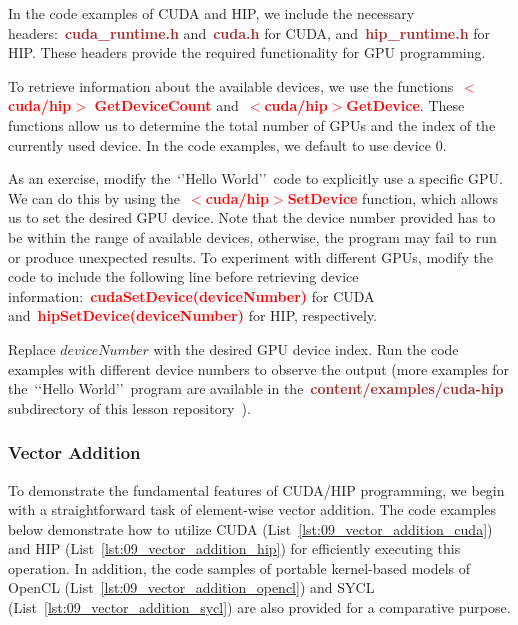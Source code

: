 


\par
In the code examples of CUDA and HIP, we include the necessary headers:~\textbf{\textcolor{brown}{cuda\_runtime.h}} and~\textbf{\textcolor{brown}{cuda.h}} for CUDA, and~\textbf{\textcolor{brown}{hip\_runtime.h}} for HIP.
These headers provide the required functionality for GPU programming.


\par
To retrieve information about the available devices, we use the functions~\textbf{\textcolor{red}{$<$cuda/hip$>$}} \textbf{\textcolor{red}{GetDeviceCount}} and~\textbf{\textcolor{red}{$<$cuda/hip$>$GetDevice}}.
These functions allow us to determine the total number of GPUs and the index of the currently used device.
In the code examples, we default to use device 0.


\par
As an exercise, modify the~\lq\rq Hello World\rq\rq~code to explicitly use a specific GPU.
We can do this by using the~\textbf{\textcolor{red}{$<$cuda/hip$>$SetDevice}} function, which allows us to set the desired GPU device.
Note that the device number provided has to be within the range of available devices, otherwise, the program may fail to run or produce unexpected results.
To experiment with different GPUs, modify the code to include the following line before retrieving device information:~\textbf{\textcolor{red}{cudaSetDevice(deviceNumber)}} for CUDA and~\textbf{\textcolor{red}{hipSetDevice(deviceNumber)}} for HIP, respectively.


\par
Replace $deviceNumber$ with the desired GPU device index.
Run the code examples with different device numbers to observe the output (more examples for the~\lq\lq Hello World\rq\rq~program are available in the~\textbf{\textcolor{brown}{content/examples/cuda-hip}} subdirectory of this lesson repository~\cite{gpu-programming-examples}).


\subsubsection{Vector Addition}\label{sec:vector_addition}


\par
To demonstrate the fundamental features of CUDA/HIP programming, we begin with a straightforward task of element-wise vector addition.
The code examples below demonstrate how to utilize CUDA (List~\ref{lst:09_vector_addition_cuda}) and HIP (List~\ref{lst:09_vector_addition_hip}) for efficiently executing this operation.
In addition, the code samples of portable kernel-based models of OpenCL (List~\ref{lst:09_vector_addition_opencl}) and SYCL (List~\ref{lst:09_vector_addition_sycl}) are also provided for a comparative purpose.


